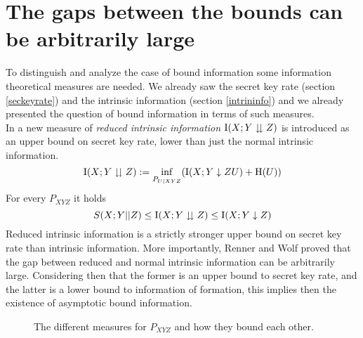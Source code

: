 \section{The gaps between the bounds can be arbitrarily large}
    To distinguish and analyze the case of bound information some information theoretical measures are needed. 
    We already saw the secret key rate (section \ref{seckeyrate}) and the intrinsic information (section \ref{intrininfo}) and we already presented the question of bound information in terms of such measures. \\
    In \cite{RW03} a new measure of \emph{reduced intrinsic information} $\operatorname{I}(X;Y\downdownarrows Z)$ is introduced as an upper bound on secret key rate, lower than just the normal intrinsic information.
    \begin{equation} \label{eq:reducedintrinfo}
    	\operatorname{I}(X;Y\downdownarrows Z) := \inf_{P_{U|XYZ}} (\operatorname{I}(X;Y\downarrow ZU) + \operatorname{H} (U))
    \end{equation}
    For every $P_{XYZ}$ it holds
    \begin{equation} \label{eq:bounds}
    	S(X;Y||Z) \leq \operatorname{I}(X;Y\downdownarrows Z) \leq \operatorname{I}(X;Y\downarrow Z)
    \end{equation}
    	Reduced intrinsic information is a strictly stronger upper bound on secret key rate than intrinsic information.
    	More importantly, Renner and Wolf proved that the gap between reduced and normal intrinsic information can be arbitrarily large. 
    	Considering then that the former is an upper bound to secret key rate, and the latter is a lower bound to information of formation, this implies then the existence of asymptotic bound information.
    	\begin{figure}[h!]
    		
    		\caption{The different measures for $P_{XYZ}$ and how they bound each other.}
    	\end{figure}
    	
